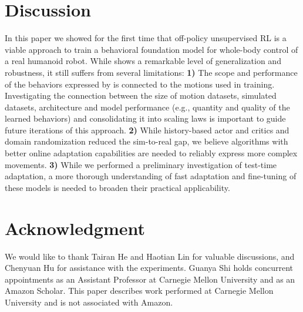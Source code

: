 \section{Discussion}\label{sec:discussion}
\vspace{-2mm}
In this paper we showed for the first time that off-policy unsupervised RL is a viable approach to train a behavioral foundation model for whole-body control of a real humanoid robot. While \method shows a remarkable level of generalization and robustness, it still suffers from several limitations: \textbf{1)} The scope and performance of the behaviors expressed by \method is connected to the motions used in training. Investigating the connection between the size of motion datasets, simulated datasets, architecture and model performance (e.g., quantity and quality of the learned behaviors) and consolidating it into scaling laws is important to guide future iterations of this approach. \textbf{2)} While history-based actor and critics and domain randomization reduced the sim-to-real gap, we believe algorithms with better online adaptation capabilities are needed to reliably express more complex movements. \textbf{3)} While we performed a preliminary investigation of test-time adaptation, a more thorough understanding of fast adaptation and fine-tuning of these models is needed to broaden their practical applicability.

\section{Acknowledgment}
\vspace{-2mm}
We would like to thank Tairan He and Haotian Lin for valuable discussions, and Chenyuan Hu for assistance with the experiments. Guanya Shi holds concurrent appointments as
an Assistant Professor at Carnegie Mellon University and as an Amazon Scholar. This paper describes work performed at Carnegie Mellon University and is not associated with Amazon.
